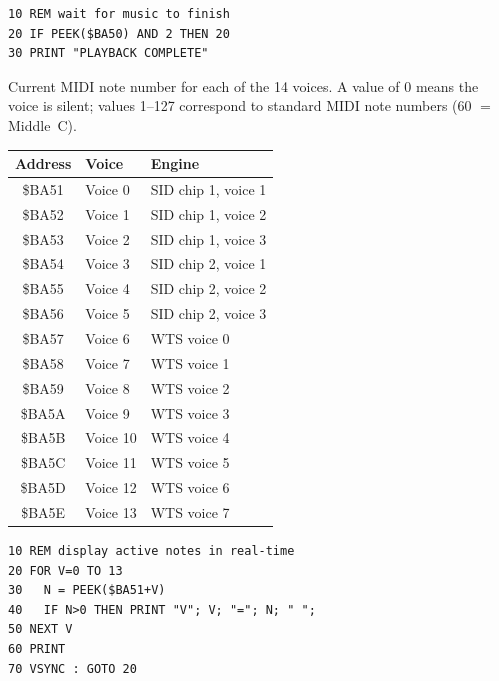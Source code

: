 \begin{lstlisting}
10 REM wait for music to finish
20 IF PEEK($BA50) AND 2 THEN 20
30 PRINT "PLAYBACK COMPLETE"
\end{lstlisting}



Current MIDI note number for each of the 14 voices.  A value of 0 means
the voice is silent; values 1--127 correspond to standard MIDI note
numbers (60 $=$ Middle~C).

\begin{center}
\small
\begin{tabular}{@{}cll@{}}
\toprule
\textbf{Address} & \textbf{Voice} & \textbf{Engine} \\
\midrule
\$BA51 & Voice 0  & SID chip 1, voice 1 \\
\$BA52 & Voice 1  & SID chip 1, voice 2 \\
\$BA53 & Voice 2  & SID chip 1, voice 3 \\
\$BA54 & Voice 3  & SID chip 2, voice 1 \\
\$BA55 & Voice 4  & SID chip 2, voice 2 \\
\$BA56 & Voice 5  & SID chip 2, voice 3 \\
\$BA57 & Voice 6  & WTS voice 0 \\
\$BA58 & Voice 7  & WTS voice 1 \\
\$BA59 & Voice 8  & WTS voice 2 \\
\$BA5A & Voice 9  & WTS voice 3 \\
\$BA5B & Voice 10 & WTS voice 4 \\
\$BA5C & Voice 11 & WTS voice 5 \\
\$BA5D & Voice 12 & WTS voice 6 \\
\$BA5E & Voice 13 & WTS voice 7 \\
\bottomrule
\end{tabular}
\end{center}

\begin{lstlisting}
10 REM display active notes in real-time
20 FOR V=0 TO 13
30   N = PEEK($BA51+V)
40   IF N>0 THEN PRINT "V"; V; "="; N; " ";
50 NEXT V
60 PRINT
70 VSYNC : GOTO 20
\end{lstlisting}




